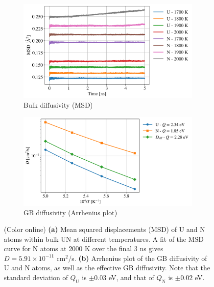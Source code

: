 \documentclass[preprint,12pt,sort&compress]{elsarticle} %
\newcommand{\?}{\stackrel{?}{=}}
\providecommand{\DIFaddtex}[1]{{\sf #1}} %
\providecommand{\DIFaddFL}[1]{\DIFadd{#1}} %
\providecommand{\DIFaddbeginFL}{} %
\providecommand{\DIFaddendFL}{} %
\providecommand{\DIFadd}[1]{\texorpdfstring{\DIFaddtex{#1}}{#1}} %
\newcommand{\DIFaddincludegraphics}[2][]{{\color{blue}\fbox{\DIFOincludegraphics[#1]{#2}}}} %
\DeclareRobustCommand{\DIFaddbeginFL}{\DIFOaddbeginFL \let\includegraphics\DIFaddincludegraphics} %
\DeclareRobustCommand{\DIFaddendFL}{\DIFOaddendFL \let\includegraphics\DIFOincludegraphics} %
\begin{document}
\begin{figure}[h!]
\centering
\begin{subfigure}{0.48\textwidth}
    \includegraphics[width=\textwidth]{LatticeDiffusion.png}
    \caption{\DIFaddbeginFL \DIFaddFL{Bulk diffusivity (MSD)}\DIFaddendFL }
    \label{Fig:LatDiff}
\end{subfigure}
\hfill
\begin{subfigure}{0.48\textwidth}
    \includegraphics[width=\textwidth]{GBDiffusion.png}
    \caption{\DIFaddbeginFL \DIFaddFL{GB diffusivity (Arrhenius plot)}\DIFaddendFL }
    \label{Fig:GBDiff}
\end{subfigure}
\caption{(Color online) \textbf{(a)} Mean squared displacements (MSD) of U and N atoms within bulk UN at different temperatures. A fit of the MSD curve for N atoms at 2000 K over the final 3 ns gives $D = 5.91 \times 10^{-11}$ cm$^2$/s. \textbf{(b)} Arrhenius plot of the GB diffusivity of U and N atoms, as well as the effective GB diffusivity. Note that the standard deviation of $Q_\mathrm{U}$ is $\pm 0.03$ eV, and that of $Q_\mathrm{N}$ is $\pm 0.02$ eV.}
\label{Fig:Diff}
\end{figure}
\end{document}

